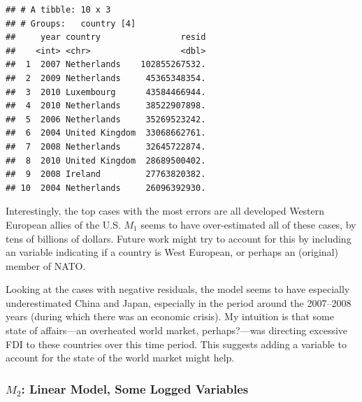 \documentclass[11pt,]{article}
\newenvironment{Shaded}{\begin{snugshade}}{\end{snugshade}}
\newcommand{\DataTypeTok}[1]{\textcolor[rgb]{0.13,0.29,0.53}{#1}}
\newcommand{\DecValTok}[1]{\textcolor[rgb]{0.00,0.00,0.81}{#1}}
\newcommand{\KeywordTok}[1]{\textcolor[rgb]{0.13,0.29,0.53}{\textbf{#1}}}
\newcommand{\NormalTok}[1]{#1}
\newcommand{\OperatorTok}[1]{\textcolor[rgb]{0.81,0.36,0.00}{\textbf{#1}}}
\newcommand{\StringTok}[1]{\textcolor[rgb]{0.31,0.60,0.02}{#1}}
\begin{document}
\begin{Shaded}
\end{Shaded}

\begin{verbatim}
## # A tibble: 10 x 3
## # Groups:   country [4]
##     year country                resid
##    <int> <chr>                  <dbl>
##  1  2007 Netherlands    102855267532.
##  2  2009 Netherlands     45365348354.
##  3  2010 Luxembourg      43584466944.
##  4  2010 Netherlands     38522907898.
##  5  2006 Netherlands     35269523242.
##  6  2004 United Kingdom  33068662761.
##  7  2008 Netherlands     32645722874.
##  8  2010 United Kingdom  28689500402.
##  9  2008 Ireland         27763820382.
## 10  2004 Netherlands     26096392930.
\end{verbatim}

Interestingly, the top cases with the most errors are all developed
Western European allies of the U.S. \(M_1\) seems to have over-estimated
all of these cases, by tens of billions of dollars. Future work might
try to account for this by including an variable indicating if a country
is West European, or perhaps an (original) member of NATO.

Looking at the cases with negative residuals, the model seems to have
especially underestimated China and Japan, especially in the period
around the 2007--2008 years (during which there was an economic crisis).
My intuition is that some state of affairs---an overheated world market,
perhaps?---was directing excessive FDI to these countries over this time
period. This suggests adding a variable to account for the state of the
world market might help.

\hypertarget{m_2-linear-model-some-logged-variables}{%
\subsubsection{\texorpdfstring{\(M_2\): Linear Model, Some Logged
Variables}{M\_2: Linear Model, Some Logged Variables}}\label{m_2-linear-model-some-logged-variables}}
\end{document}
